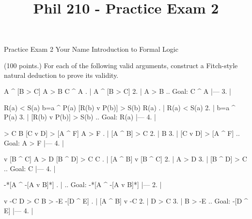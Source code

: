 
\title{Phil 210 - Practice Exam 2}

\heading
Practice Exam 2
Your Name
Introduction to Formal Logic
\endheading

(100 points.) For each of the following valid arguments, construct a Fitch-style natural deduction to prove its validity.

\problems
{}
\argument
 A ^ [B > C]
 A > B
\argumentline
 C ^ A
\endargument
{}
	\answer
	. | A ^ [B > C]
	 2. | A > B        ..  Goal: C ^ A
	    |---
	 3. | 
	\endfitchproof
	\endanswer

\argument
 R(a) < S(a)
 b=a ^ P(a)
 [R(b) v P(b)] > S(b)
\argumentline
 R(a)
\endargument
{}
	\answer
	. | R(a) < S(a)
	 2. | b=a ^ P(a)
	 3. | [R(b) v P(b)] > S(b)  ..  Goal: R(a)
	    |---
	 4. | 
	\endfitchproof
	\endanswer

\argument
 [A ^ B] > C
 B
 [C v D] > [A ^ F]
\argumentline
 A > F
\endargument
{}
	\answer
	. | [A ^ B] > C
	 2. | B
	 3. | [C v D] > [A ^ F]  ..  Goal: A > F
	    |---
	 4. | 
	\endfitchproof
	\endanswer

\argument
 [A ^ B] v [B ^ C]
 A > D
 [B ^ D] > C
\argumentline
 C
\endargument
{}
	\answer
	. | [A ^ B] v [B ^ C]
	 2. | A > D
	 3. | [B ^ D] > C        ..  Goal: C
	    |---
	 4. | 
	\endfitchproof
	\endanswer

\argument

\argumentline
 -*[A ^ -[A v B]*]
\endargument
{}
	\answer
	. |                    ..  Goal: -*[A ^ -[A v B]*]
	    |---
	 2. | 
	\endfitchproof
	\endanswer

\argument
 [A ^ B] v -C
 D > C
 B > -E
\argumentline
 -[D ^ E]
\endargument
{}
	\answer
	. | [A ^ B] v -C
	 2. | D > C
	 3. | B > -E         ..  Goal: -[D ^ E]
	    |---
	 4. | 
	\endfitchproof
	\endanswer

\endproblems
\bye
